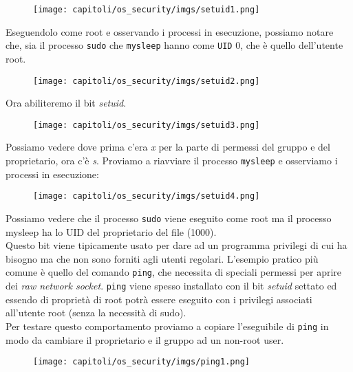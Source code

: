 \begin{figure}[H]
    \centering
    \texttt{[image: capitoli/os\_security/imgs/setuid1.png]}
\end{figure}

Eseguendolo come root e osservando i processi in esecuzione, possiamo notare che,
sia il processo \verb|sudo| che \verb|mysleep| hanno come \verb|UID| 0, che è quello
dell'utente root.

\begin{figure}[H]
    \centering
    \texttt{[image: capitoli/os\_security/imgs/setuid2.png]}
\end{figure}


Ora abiliteremo il bit \textit{setuid}.

\begin{figure}[H]
    \centering
    \texttt{[image: capitoli/os\_security/imgs/setuid3.png]}
\end{figure}

Possiamo vedere dove prima c'era \textit{x} per la parte di permessi del gruppo e
del proprietario, ora c'è \textit{s}. Proviamo a riavviare il processo \verb|mysleep|
e osserviamo i processi in esecuzione:

\begin{figure}[H]
    \centering
    \texttt{[image: capitoli/os\_security/imgs/setuid4.png]}
\end{figure}

Possiamo vedere che il processo \verb|sudo| viene eseguito come root ma il processo
mysleep ha lo UID del proprietario del file (1000).\\

Questo bit viene tipicamente usato per dare ad un programma privilegi di cui ha
bisogno ma che non sono forniti agli utenti regolari. L'esempio pratico più comune
è quello del comando \verb|ping|, che necessita di speciali permessi per aprire
dei \textit{raw network socket}. \verb|ping| viene spesso installato con il bit
\textit{setuid} settato ed essendo di proprietà di root potrà essere eseguito con
i privilegi associati all'utente root (senza la necessità di sudo).\\
Per testare questo comportamento proviamo a copiare l'eseguibile di \verb|ping|
in modo da cambiare il proprietario e il gruppo ad un non-root user.

\begin{figure}[H]
    \centering
    \texttt{[image: capitoli/os\_security/imgs/ping1.png]}
\end{figure}

